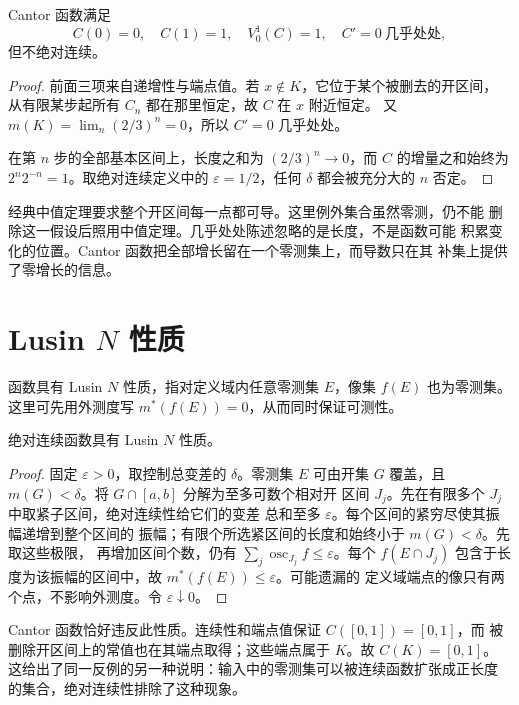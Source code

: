 \begin{proposition}\label{prop:cantor-function}
Cantor 函数满足
\[
 C(0)=0,\quad C(1)=1,\quad V_0^1(C)=1,\quad C'=0\ \text{几乎处处},
\]
但不绝对连续。
\end{proposition}
\begin{proof}
前面三项来自递增性与端点值。若 \(x\notin K\)，它位于某个被删去的开区间，
从有限某步起所有 \(C_n\) 都在那里恒定，故 \(C\) 在 \(x\) 附近恒定。
又 \(m(K)=\lim_n(2/3)^n=0\)，所以 \(C'=0\) 几乎处处。

在第 \(n\) 步的全部基本区间上，长度之和为 \((2/3)^n\to0\)，而
\(C\) 的增量之和始终为 \(2^n2^{-n}=1\)。取绝对连续定义中的
\(\varepsilon=1/2\)，任何 \(\delta\) 都会被充分大的 \(n\) 否定。
\end{proof}

经典中值定理要求整个开区间每一点都可导。这里例外集合虽然零测，仍不能
删除这一假设后照用中值定理。几乎处处陈述忽略的是长度，不是函数可能
积累变化的位置。Cantor 函数把全部增长留在一个零测集上，而导数只在其
补集上提供了零增长的信息。

\section{Lusin \texorpdfstring{\(N\)}{N} 性质}

\begin{definition}
函数具有 Lusin \(N\) 性质，指对定义域内任意零测集 \(E\)，像集 \(f(E)\)
也为零测集。这里可先用外测度写 \(m^*(f(E))=0\)，从而同时保证可测性。
\end{definition}

\begin{theorem}\label{thm:ac-lusin-n}
绝对连续函数具有 Lusin \(N\) 性质。
\end{theorem}
\begin{proof}
固定 \(\varepsilon>0\)，取控制总变差的 \(\delta\)。零测集 \(E\) 可由开集
\(G\) 覆盖，且 \(m(G)<\delta\)。将 \(G\cap[a,b]\) 分解为至多可数个相对开
区间 \(J_j\)。先在有限多个 \(J_j\) 中取紧子区间，绝对连续性给它们的变差
总和至多 \(\varepsilon\)。每个区间的紧穷尽使其振幅递增到整个区间的
振幅；有限个所选紧区间的长度和始终小于 \(m(G)<\delta\)。先取这些极限，
再增加区间个数，仍有
\(\sum_j\operatorname{osc}_{J_j}f\le\varepsilon\)。每个 \(f(E\cap J_j)\)
包含于长度为该振幅的区间中，故 \(m^*(f(E))\le\varepsilon\)。可能遗漏的
定义域端点的像只有两个点，不影响外测度。令 \(\varepsilon\downarrow0\)。
\end{proof}

Cantor 函数恰好违反此性质。连续性和端点值保证 \(C([0,1])=[0,1]\)，而
被删除开区间上的常值也在其端点取得；这些端点属于 \(K\)。故 \(C(K)=[0,1]\)。
这给出了同一反例的另一种说明：输入中的零测集可以被连续函数扩张成正长度
的集合，绝对连续性排除了这种现象。

